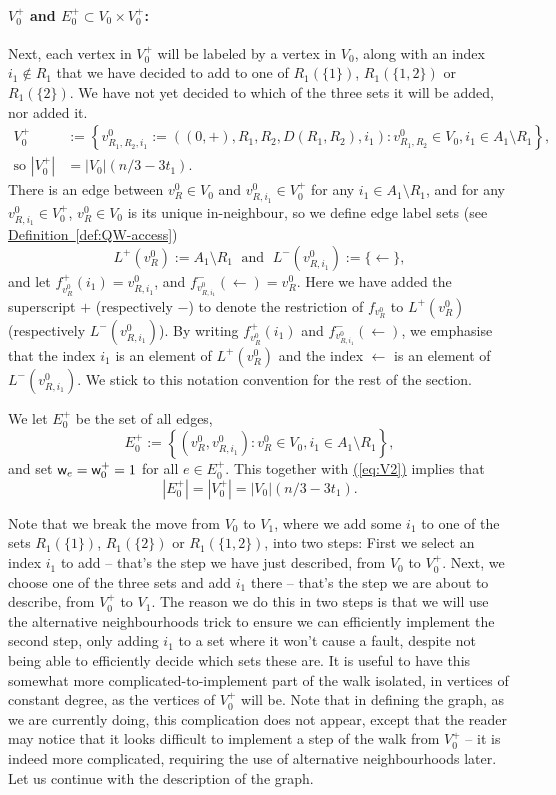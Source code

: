 \documentclass{article}
\newcommand{\eq}[1]{\hyperref[eq:#1]{(\ref*{eq:#1})}}
\newcommand{\defin}[1]{\hyperref[def:#1]{Definition~\ref*{def:#1}}}
\renewcommand{\>}{\rangle}
\newcommand{\<}{\langle}
\renewcommand{\(}{\left(}
\renewcommand{\)}{\right)}
\def\w{{\sf w}}
\begin{document}
\paragraph{$V_0^+$ and $E_0^+\subset V_0\times V_0^+$:} Next, each vertex in $V_0^+$ will be labeled by a vertex in $V_0$, along with an index $i_1\not\in R_1$ that we have decided to add to one of $R_1(\{1\})$, $R_1(\{1,2\})$ or $R_1(\{2\})$. We have not yet decided to which of the three sets it will be added, nor added it. 
\begin{align}
V_0^+ &:=\left\{v^0_{R_1,R_2,i_1}:=((0,+),R_1,R_2,D(R_1,R_2),i_1): v^0_{R_1,R_2}\in V_0,i_1\in A_1\setminus R_1\right\},\nonumber\\
\mbox{so }|V_0^+| &= |V_0| (n/3-3t_1).\label{eq:V2}
\end{align}
There is an edge between $v^0_{R}\in V_0$ and $v^0_{R,i_1}\in V_0^+$ for any $i_1\in A_1\setminus R_1$, and for any $v^0_{R,i_1}\in V_0^+$, $v^0_{R}\in V_0$ is its unique in-neighbour, so we define edge label sets (see \defin{QW-access})
$$L^+(v_{R}^0):=A_1\setminus R_1
\;\mbox{ and }\;
L^-(v_{R,i_1}^0):=\{\leftarrow\},$$
and let $f^+_{v_{R}^0}(i_1) = v_{R,i_1}^0$, and $f^-_{v_{R,i_1}^0}(\leftarrow) = v_{R}^0$. Here we have added the superscript $+$ (respectively $-$) to denote the restriction of $f_{v_{R}^0}$ to $L^+(v_{R}^0)$ (respectively $L^-(v_{R,i_1}^0)$). By writing $f^+_{v_{R}^0}(i_1)$ and $f^-_{v_{R,i_1}^0}(\leftarrow)$, we emphasise that the index $i_1$ is an element of $L^+(v_{R}^0)$ and the index $\leftarrow$ is an element of $L^-(v_{R,i_1}^0)$. We stick to this notation convention for the rest of the section. 

\noindent We let $E_0^+$ be the set of all edges,
$$E_0^+:=\left\{\left(v^0_{R},v^0_{R,i_1}\right):v^0_{R}\in V_0, i_1 \in A_1 \setminus R_1\right\},$$
and set $\w_e = \w_0^+=1$ for all $e \in E_0^+$. This together with \eq{V2} implies that
\begin{equation}
|E_0^+|=|V_0^+|=|V_0|(n/3-3t_1).\label{eq:E1}
\end{equation}

Note that we break the move from $V_0$ to $V_1$, where we add some $i_1$ to one of the sets $R_1(\{1\})$, $R_1(\{2\})$ or $R_1(\{1,2\})$, into two steps: First we select an index $i_1$ to add -- that's the step we have just described, from $V_0$ to $V_0^+$. Next, we choose one of the three sets and add $i_1$ there -- that's the step we are about to describe, from $V_0^+$ to $V_1$. The reason we do this in two steps is that we will use the alternative neighbourhoods trick to ensure we can efficiently implement the second step, only adding $i_1$ to a set where it won't cause a fault, despite not being able to efficiently decide which sets these are. It is useful to have this somewhat more complicated-to-implement part of the walk isolated, in vertices of constant degree, as the vertices of $V_0^+$ will be. Note that in defining the graph, as we are currently doing, this complication does not appear, except that the reader may notice that it looks difficult to implement a step of the walk from $V_0^+$ -- it is indeed more complicated, requiring the use of alternative neighbourhoods later. Let us continue with the description of the graph.
\end{document}
